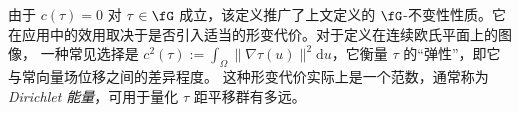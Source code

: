 由于 $c(\tau)=0$ 对 $\tau \in \fG$ 成立，该定义推广了上文定义的 $\fG$-不变性性质。它在应用中的效用取决于是否引入适当的形变代价。对于定义在连续欧氏平面上的图像，
一种常见选择是 $c^2(\tau) := \int_\Omega \| \nabla \tau(u)\|^2 \mathrm{d}u$，它衡量 $\tau$ 的“弹性”，即它与常向量场位移之间的差异程度。
%
这种形变代价实际上是一个范数，通常称为{\em Dirichlet 能量}，可用于量化 $\tau$ 距平移群有多远。

%



